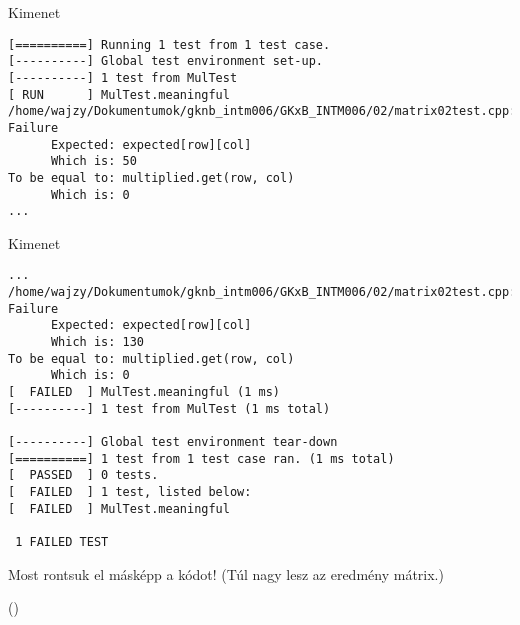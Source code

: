\documentclass[usenames,dvipsnames,aspectratio=169]{beamer}
\begin{document}
\begin{frame}[fragile]
  \begin{block}{Kimenet}
    \footnotesize
    \begin{verbatim}
[==========] Running 1 test from 1 test case.
[----------] Global test environment set-up.
[----------] 1 test from MulTest
[ RUN      ] MulTest.meaningful
/home/wajzy/Dokumentumok/gknb_intm006/GKxB_INTM006/02/matrix02test.cpp:25: Failure
      Expected: expected[row][col]
      Which is: 50
To be equal to: multiplied.get(row, col)
      Which is: 0
...
\end{verbatim}
  \end{block}
\end{frame}

\begin{frame}[fragile]
  \footnotesize
  \begin{block}{Kimenet}
    \begin{verbatim}
...
/home/wajzy/Dokumentumok/gknb_intm006/GKxB_INTM006/02/matrix02test.cpp:25: Failure
      Expected: expected[row][col]
      Which is: 130
To be equal to: multiplied.get(row, col)
      Which is: 0
[  FAILED  ] MulTest.meaningful (1 ms)
[----------] 1 test from MulTest (1 ms total)

[----------] Global test environment tear-down
[==========] 1 test from 1 test case ran. (1 ms total)
[  PASSED  ] 0 tests.
[  FAILED  ] 1 test, listed below:
[  FAILED  ] MulTest.meaningful

 1 FAILED TEST
\end{verbatim}
  \end{block}
\end{frame}

\begin{frame}
  Most rontsuk el másképp a kódot! (Túl nagy lesz az eredmény mátrix.)
  \begin{exampleblock}{ %
    ()}
    
  \end{exampleblock}
\end{frame}

\begin{frame}
  \begin{exampleblock}{}
    \footnotesize
    
  \end{exampleblock}
\end{frame}
\end{document}
